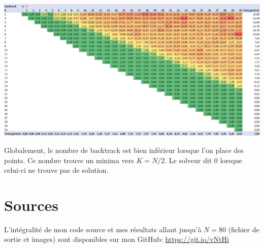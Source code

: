 \documentclass[a4paper, 10pt]{article}
\begin{document}
			\begin{center} \includegraphics[width=\textwidth]{backtrack30.png} \end{center}

			Globalement, le nombre de backtrack est bien inférieur lorsque l'on place des points. Ce nombre trouve un minima vers $K=N/2$. Le solveur dit 0 lorsque celui-ci ne trouve pas de solution.

        \section{Sources}
            L'intégralité de mon code source et mes résultats allant jusqu'à $N=80$ (fichier de sortie et images) sont disponibles sur mon GitHub:
            \href{https://github.com/kevingrillet/KQueens}{https://git.io/vNtHi}
\end{document}
